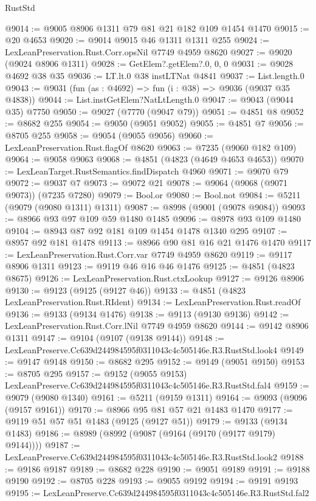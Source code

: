 \begin{lexlean}{RustStd}
\begin{coremodule}
@9014 := @9005 @8906 @1311 @79 @81 @21 @182 @109 @1454 @1470
@9015 := @20 @4653
@9020 := @9014 @9015 @46 @1311 @1311 @255
@9024 := LexLeanPreservation.Rust.Corr.opsNil @7749 @4959 @8620
@9027 := @9020 (@9024 @8906 @1311)
@9028 := GetElem?.getElem?.{0, 0, 0}
@9031 := @9028 @4692 @38 @35
@9036 := LT.lt.{0} @38 instLTNat @4841
@9037 := List.length.{0}
@9043 := @9031 (fun (as : @4692) => fun (i : @38) => @9036 (@9037 @35 @4838))
@9044 := List.instGetElem?NatLtLength.{0}
@9047 := @9043 (@9044 @35) @7750
@9050 := @9027 (@7770 (@9047 @79))
@9051 := @4851 @8
@9052 := @8682 @255
@9054 := @9050 (@9051 @9052)
@9055 := @4851 @7
@9056 := @8705 @255
@9058 := @9054 (@9055 @9056)
@9060 := LexLeanPreservation.Rust.flagOf @8620
@9063 := @7235 (@9060 @182 @109)
@9064 := @9058 @9063
@9068 := @4851 (@4823 (@4649 @4653 @4653))
@9070 := LexLeanTarget.RustSemantics.findDispatch @4960
@9071 := @9070 @79
@9072 := @9037 @7
@9073 := @9072 @21
@9078 := @9064 (@9068 (@9071 @9073)) (@7235 @7280)
@9079 := Bool.or
@9080 := Bool.not
@9084 := @5211 (@9079 (@9080 @1311) @1311)
@9087 := @8998 (@9001 (@9078 @9084))
@9093 := @8966 @93 @97 @109 @59 @1480 @1485
@9096 := @8978 @93 @109 @1480
@9104 := @8943 @87 @92 @181 @109 @1454 @1478 @1340 @295
@9107 := @8957 @92 @181 @1478
@9113 := @8966 @90 @81 @16 @21 @1476 @1470
@9117 := LexLeanPreservation.Rust.Corr.var @7749 @4959 @8620
@9119 := @9117 @8906 @1311
@9123 := @9119 @46 @16 @46 @1476
@9125 := @4851 (@4823 @8675)
@9126 := LexLeanPreservation.Rust.ctxLookup
@9127 := @9126 @8906
@9130 := @9123 (@9125 (@9127 @46))
@9133 := @4851 (@4823 LexLeanPreservation.Rust.RIdent)
@9134 := LexLeanPreservation.Rust.readOf
@9136 := @9133 (@9134 @1476)
@9138 := @9113 (@9130 @9136)
@9142 := LexLeanPreservation.Rust.Corr.lNil @7749 @4959 @8620
@9144 := @9142 @8906 @1311
@9147 := @9104 (@9107 (@9138 @9144))
@9148 := LexLeanPreserve.Cc639d244984595f0311043c4c505146e.R3.RustStd.look4
@9149 := @9147 @9148
@9150 := @8682 @295
@9152 := @9149 (@9051 @9150)
@9153 := @8705 @295
@9157 := @9152 (@9055 @9153) LexLeanPreserve.Cc639d244984595f0311043c4c505146e.R3.RustStd.fal4
@9159 := @9079 (@9080 @1340)
@9161 := @5211 (@9159 @1311)
@9164 := @9093 (@9096 (@9157 @9161))
@9170 := @8966 @95 @81 @57 @21 @1483 @1470
@9177 := @9119 @51 @57 @51 @1483 (@9125 (@9127 @51))
@9179 := @9133 (@9134 @1483)
@9186 := @8989 (@8992 (@9087 (@9164 (@9170 (@9177 @9179) @9144))))
@9187 := LexLeanPreserve.Cc639d244984595f0311043c4c505146e.R3.RustStd.look2
@9188 := @9186 @9187
@9189 := @8682 @228
@9190 := @9051 @9189
@9191 := @9188 @9190
@9192 := @8705 @228
@9193 := @9055 @9192
@9194 := @9191 @9193
@9195 := LexLeanPreserve.Cc639d244984595f0311043c4c505146e.R3.RustStd.fal2

\end{coremodule}
\end{lexlean}
